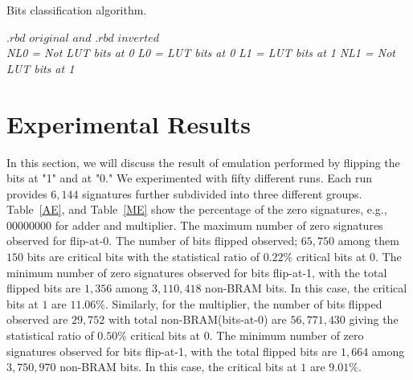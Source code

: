 \begin{algorithm}
\caption{Bits classification algorithm.}
\begin{algorithmic}
\label{BCA}
\REQUIRE $.rbd$ $original$ $and$ $.rbd$ $inverted$ \\
\vspace{0.20 cm }
\vspace{0.10 cm }
\STATE \textit{ NL0 = Not LUT bits at 0}
\vspace{0.10 cm }
\vspace{0.10 cm }
\STATE \textit{ L0 = LUT bits at 0}
\vspace{0.10 cm }
\vspace{0.10 cm }
\STATE \textit{ L1 =  LUT bits at 1}
\vspace{0.10 cm }
\vspace{0.10 cm }
\STATE \textit{ NL1 = Not LUT bits at 1}
\vspace{0.10 cm }


\ENDIF
\vspace{0.20 cm }
\end{algorithmic}
\end{algorithm}



\section{Experimental Results}
\label{Experimental Results}
In this section, we will discuss the result of emulation performed by flipping the bits at "1" and at "0." We experimented with fifty different runs. Each run provides $6,144$ signatures further subdivided into three different groups. 
Table~\ref{AE}, and Table~\ref{ME} show the percentage of the zero signatures, e.g., $00000000$ for adder and multiplier. The maximum number of zero signatures observed for flip-at-0. The number of bits flipped observed; $65,750$ among them $150$ bits are critical bits with the statistical ratio of $0.22\%$ critical bits at $0$. The minimum number of zero signatures observed for bits flip-at-1, with the total flipped bits are $1,356$ among $3,110,418$ non-BRAM bits. In this case, the critical bits at $1$ are $11.06\%$. 
Similarly, for the multiplier,  the number of bits flipped observed are $29,752$ with total non-BRAM(bits-at-0) are $56,771,430$ giving the statistical ratio of $0.50\%$ critical bits at $0$. The minimum number of zero signatures observed for bits flip-at-1, with the total flipped bits are $1,664$ among $3,750,970$ non-BRAM bits. In this case, the critical bits at $1$ are $9.01\%$.

